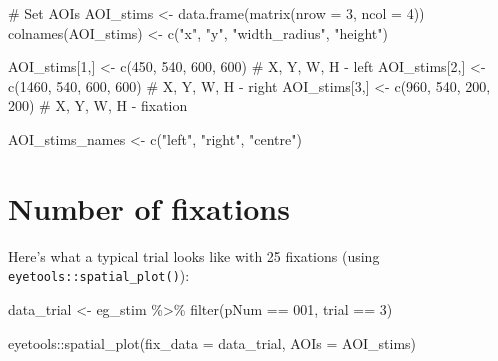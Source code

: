 \documentclass[
  letterpaper,
  DIV=11,
  numbers=noendperiod]{scrartcl}
\newenvironment{Shaded}{\begin{snugshade}}{\end{snugshade}}
\newcommand{\AttributeTok}[1]{\textcolor[rgb]{0.40,0.45,0.13}{#1}}
\newcommand{\CommentTok}[1]{\textcolor[rgb]{0.37,0.37,0.37}{#1}}
\newcommand{\DecValTok}[1]{\textcolor[rgb]{0.68,0.00,0.00}{#1}}
\newcommand{\FunctionTok}[1]{\textcolor[rgb]{0.28,0.35,0.67}{#1}}
\newcommand{\NormalTok}[1]{\textcolor[rgb]{0.00,0.23,0.31}{#1}}
\newcommand{\OtherTok}[1]{\textcolor[rgb]{0.00,0.23,0.31}{#1}}
\newcommand{\SpecialCharTok}[1]{\textcolor[rgb]{0.37,0.37,0.37}{#1}}
\newcommand{\StringTok}[1]{\textcolor[rgb]{0.13,0.47,0.30}{#1}}
\begin{document}
\begin{Shaded}
\begin{Highlighting}[]
\CommentTok{\# Set AOIs}
\NormalTok{AOI\_stims }\OtherTok{\textless{}{-}} \FunctionTok{data.frame}\NormalTok{(}\FunctionTok{matrix}\NormalTok{(}\AttributeTok{nrow =} \DecValTok{3}\NormalTok{, }\AttributeTok{ncol =} \DecValTok{4}\NormalTok{))}
\FunctionTok{colnames}\NormalTok{(AOI\_stims) }\OtherTok{\textless{}{-}} \FunctionTok{c}\NormalTok{(}\StringTok{"x"}\NormalTok{, }\StringTok{"y"}\NormalTok{, }\StringTok{"width\_radius"}\NormalTok{, }\StringTok{"height"}\NormalTok{)}

\NormalTok{AOI\_stims[}\DecValTok{1}\NormalTok{,] }\OtherTok{\textless{}{-}} \FunctionTok{c}\NormalTok{(}\DecValTok{450}\NormalTok{, }\DecValTok{540}\NormalTok{, }\DecValTok{600}\NormalTok{, }\DecValTok{600}\NormalTok{) }\CommentTok{\# X, Y, W, H {-} left}
\NormalTok{AOI\_stims[}\DecValTok{2}\NormalTok{,] }\OtherTok{\textless{}{-}} \FunctionTok{c}\NormalTok{(}\DecValTok{1460}\NormalTok{, }\DecValTok{540}\NormalTok{, }\DecValTok{600}\NormalTok{, }\DecValTok{600}\NormalTok{) }\CommentTok{\# X, Y, W, H {-} right}
\NormalTok{AOI\_stims[}\DecValTok{3}\NormalTok{,] }\OtherTok{\textless{}{-}} \FunctionTok{c}\NormalTok{(}\DecValTok{960}\NormalTok{, }\DecValTok{540}\NormalTok{, }\DecValTok{200}\NormalTok{, }\DecValTok{200}\NormalTok{) }\CommentTok{\# X, Y, W, H {-} fixation}

\NormalTok{AOI\_stims\_names }\OtherTok{\textless{}{-}} \FunctionTok{c}\NormalTok{(}\StringTok{"left"}\NormalTok{, }\StringTok{"right"}\NormalTok{, }\StringTok{"centre"}\NormalTok{)}
\end{Highlighting}
\end{Shaded}

\hypertarget{number-of-fixations}{%
\section{Number of fixations}\label{number-of-fixations}}

Here's what a typical trial looks like with 25 fixations (using
\texttt{eyetools::spatial\_plot()}):

\begin{Shaded}
\begin{Highlighting}[]
\NormalTok{data\_trial }\OtherTok{\textless{}{-}} 
\NormalTok{  eg\_stim }\SpecialCharTok{\%\textgreater{}\%} 
  \FunctionTok{filter}\NormalTok{(pNum }\SpecialCharTok{==} \DecValTok{001}\NormalTok{, }
\NormalTok{         trial }\SpecialCharTok{==} \DecValTok{3}\NormalTok{)}

\NormalTok{eyetools}\SpecialCharTok{::}\FunctionTok{spatial\_plot}\NormalTok{(}\AttributeTok{fix\_data =}\NormalTok{ data\_trial, }
                       \AttributeTok{AOIs =}\NormalTok{ AOI\_stims)}
\end{Highlighting}
\end{Shaded}
\end{document}
